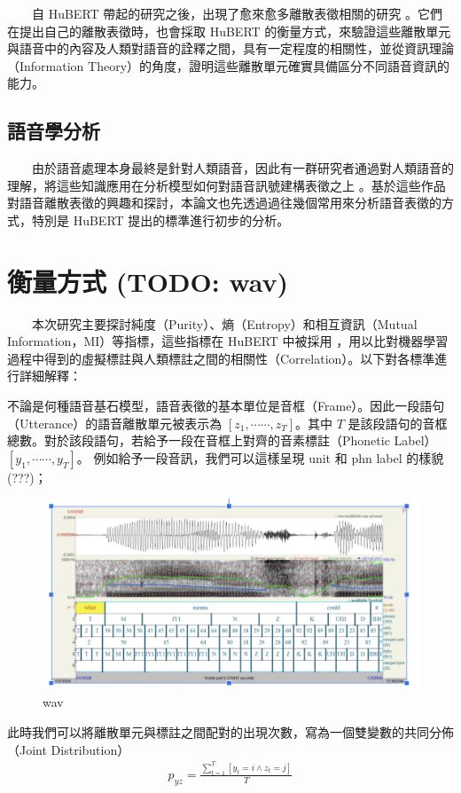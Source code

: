 {　　自 HuBERT 帶起的研究之後，出現了愈來愈多離散表徵相關的研究\cite{10097097, abdullah23_interspeech, chang_exploration_2023, liu2024dinosr, zhang2024speechtokenizer, huang2023repcodec} 。它們在提出自己的離散表徵時，也會採取 HuBERT 的衡量方式，來驗證這些離散單元與語音中的內容及人類對語音的詮釋之間，具有一定程度的相關性，並從資訊理論（Information Theory）的角度，證明這些離散單元確實具備區分不同語音資訊的能力。

\subsection{語音學分析}

　　由於語音處理本身最終是針對人類語音，因此有一群研究者通過對人類語音的理解，將這些知識應用在分析模型如何對語音訊號建構表徵之上\cite{deseyssel22_interspeech, wells_phonetic_2022, 10097097, abdullah23_interspeech} 。基於這些作品對語音離散表徵的興趣和探討，本論文也先透過過往幾個常用來分析語音表徵的方式，特別是 HuBERT \cite{hsu_hubert_2021-2} 提出的標準進行初步的分析。


\section{衡量方式 (TODO: wav)}

　　本次研究主要探討純度（Purity）、熵（Entropy）和相互資訊（Mutual Information，MI）等指標，這些指標在 HuBERT 中被採用 \cite{hsu_hubert_2021, hsu_hubert_2021-2}，用以比對機器學習過程中得到的虛擬標註與人類標註之間的相關性（Correlation）。以下對各標準進行詳細解釋：

        不論是何種語音基石模型，語音表徵的基本單位是音框（Frame）。因此一段語句（Utterance）的語音離散單元被表示為 $[z_1, \cdots\cdots, z_T]$。其中 $T$ 是該段語句的音框總數。對於該段語句，若給予一段在音框上對齊的音素標註（Phonetic Label） $[y_1, \cdots\cdots, y_T]$。
        例如給予一段音訊，我們可以這樣呈現 unit 和 phn label 的樣貌 (???)；
        
        \begin{figure}
            \centering
            \includegraphics[width=1\linewidth]{figures/wav.png}
            \caption{wav}
            \label{fig:enter-labelwav}
        \end{figure}
        此時我們可以將離散單元與標註之間配對的出現次數，寫為一個雙變數的共同分佈（Joint Distribution）
\begin{align}
    p_{yz} = \frac{\sum^T_{t=1}[{y_t = i \wedge z_t = j}]}{T}
\end{align}

}
